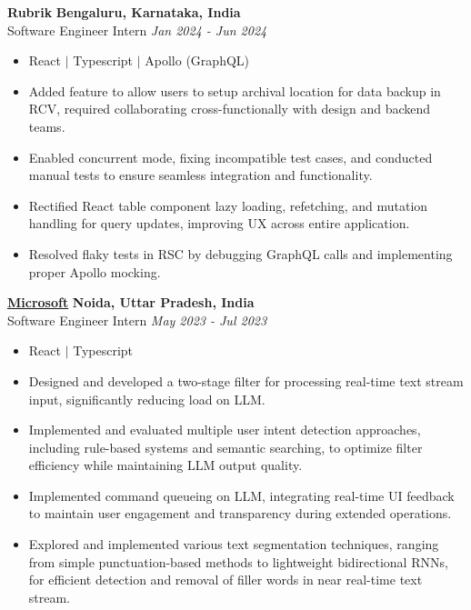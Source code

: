 \documentclass[12pt]{article}
\begin{document}
\textbf{Rubrik} \hfill \textbf{Bengaluru, Karnataka, India} \\
Software Engineer Intern  \hfill \textit{Jan 2024 - Jun 2024} \\
\begin{itemize}[topsep=1pt, itemsep=1.5pt, partopsep=1pt, parsep=1pt]
	\item React $|$ Typescript $|$ Apollo (GraphQL)
	\item Added feature to allow users to setup archival location for data backup in RCV, required collaborating cross-functionally with design and backend teams.
	\item Enabled concurrent mode, fixing incompatible test cases, and conducted manual tests to ensure seamless integration and functionality.
	\item Rectified React table component lazy loading, refetching, and mutation handling for query updates, improving UX across entire application.
	\item Resolved flaky tests in RSC by debugging GraphQL calls and implementing proper Apollo mocking.
\end{itemize}



\textbf{\href{https://drive.google.com/file/d/1AmHyhbctI577QKw8zxRCBjzVVyGyQHvb/view}{Microsoft}} \hfill \textbf{Noida, Uttar Pradesh, India} \\
Software Engineer Intern  \hfill \textit{May 2023 - Jul 2023} \\
\begin{itemize}[topsep=1pt, itemsep=1.5pt, partopsep=1pt, parsep=1pt]
	\item React $|$ Typescript
	\item Designed and developed a two-stage filter for processing real-time text stream input, significantly reducing load on LLM.
	\item Implemented and evaluated multiple user intent detection approaches, including rule-based systems and semantic searching, to optimize filter efficiency while maintaining LLM output quality.
	\item Implemented command queueing on LLM, integrating real-time UI feedback to maintain user engagement and transparency during extended operations.
	\item Explored and implemented various text segmentation techniques, ranging from simple punctuation-based methods to lightweight bidirectional RNNs, for efficient detection and removal of filler words in near real-time text stream.
\end{itemize}
\end{document}
